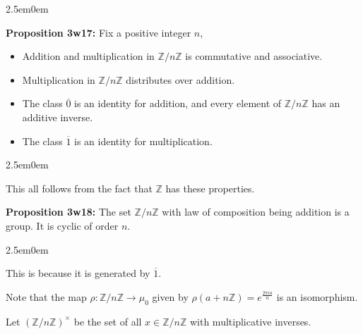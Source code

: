\documentclass{book}
\newcommand{\hTwo}{%
\color{MidnightBlue}%
   \fontsize{13}{15}\selectfont%
}
\newcommand{\hThree}{%
   \color{PineGreen!85!Orange}
   \fontsize{12}{14}\selectfont%
}
\newenvironment{myIndent}{%
   \begin{adjustwidth}{2.5em}{0em}%
}{%
   \end{adjustwidth}%
}
\newcommand{\blab}[1]{\textbf{#1}}
\newcommand{\retTwo}{\hfill\bigbreak}
\begin{document}
\begin{myIndent}\hTwo
	\blab{Proposition 3w17:} Fix a positive integer $n$,
	\begin{itemize}
		\item Addition and multiplication in $\mathbb{Z}/n\mathbb{Z}$ is commutative and associative.
		\item Multiplication in $\mathbb{Z}/n\mathbb{Z}$ distributes over addition.
		\item The class $\overline{0}$ is an identity for addition, and every element of $\mathbb{Z}/n\mathbb{Z}$ has an\\ additive inverse.
		\item The class $\overline{1}$ is an identity for multiplication.
	\end{itemize}
	
	\begin{myIndent}\hThree
		This all follows from the fact that $\mathbb{Z}$ has these properties.\retTwo
	\end{myIndent}

	\blab{Proposition 3w18:} The set $\mathbb{Z}/n\mathbb{Z}$ with law of composition being addition is a group. It is cyclic of order $n$.
	
	\begin{myIndent}\hThree
		This is because it is generated by $\overline{1}$.
	\end{myIndent}
\end{myIndent}

Note that the map $\rho: \mathbb{Z}/n\mathbb{Z} \longrightarrow \mu_0$ given by $\rho(a + n\mathbb{Z}) = e^{\frac{2\pi i a}{n}}$ is an isomorphism.\retTwo

Let $(\mathbb{Z}/n\mathbb{Z})^\times$ be the set of all $x \in \mathbb{Z}/n\mathbb{Z}$ with multiplicative inverses.\retTwo
\end{document}
